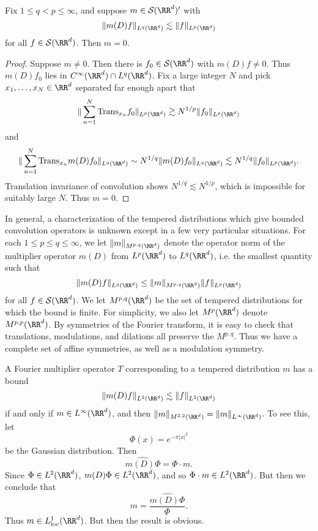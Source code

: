 \begin{theorem}
  Fix $1 \leq q < p \leq \infty$, and suppose $m \in \mathcal{S}(\RR^d)'$ with
  \[ \| m(D) f \|_{L^q(\RR^d)} \lesssim \| f \|_{L^p(\RR^d)} \]
  for all $f \in \mathcal{S}(\RR^d)$. Then $m = 0$.
\end{theorem}
\begin{proof}
  Suppose $m \neq 0$. Then there is $f_0 \in \mathcal{S}(\RR^d)$ with $m(D) f \neq 0$. Thus $m(D) f_0$ lies in $C^\infty(\RR^d) \cap L^q(\RR^d)$. Fix a large integer $N$ and pick $x_1,\dots,x_N \in \RR^d$ separated far enough apart that
  \[ \| \sum_{n = 1}^N \text{Trans}_{x_n} f_0 \|_{L^p(\RR^d)} \gtrsim N^{1/p} \| f_0 \|_{L^p(\RR^d)} \]
  and
  \[ \| \sum_{n = 1}^N \text{Trans}_{x_n} m(D) f_0 \|_{L^q(\RR^d)} \sim N^{1/q} \| m(D) f_0 \|_{L^q(\RR^d)} \lesssim N^{1/q} \| f_0 \|_{L^p(\RR^d)}. \]
  Translation invariance of convolution shows $N^{1/q} \lesssim N^{1/p}$, which is impossible for suitably large $N$. Thus $m = 0$.
\end{proof}

In general, a characterization of the tempered distributions which give bounded convolution operators is unknown except in a few very particular situations. For each $1 \leq p \leq q \leq \infty$, we let $\| m \|_{M^{p,q}(\RR^d)}$ denote the operator norm of the multiplier operator $m(D)$ from $L^p(\RR^d)$ to $L^q(\RR^d)$, i.e. the smallest quantity such that
%
\[ \| m(D) f \|_{L^q(\RR^d)} \leq \| m \|_{M^{p,q}(\RR^d)} \| f \|_{L^p(\RR^d)} \]
%
for all $f \in \mathcal{S}(\RR^d)$. We let $M^{p,q}(\RR^d)$ be the set of tempered distributions for which the bound is finite. For simplicity, we also let $M^p(\RR^d)$ denote $M^{p,p}(\RR^d)$. By symmetries of the Fourier transform, it is easy to check that translations, modulations, and dilations all preserve the $M^{p,q}$. Thus we have a complete set of affine symmetries, as well as a modulation symmetry.

\begin{example}
  A Fourier multiplier operator $T$ corresponding to a tempered distribution $m$ has a bound
  \[ \| m(D)f \|_{L^2(\RR^d)} \lesssim \| f \|_{L^2(\RR^d)} \]
  if and only if $m \in L^\infty(\RR^d)$, and then $\| m \|_{M^{2,2}(\RR^d)} = \| m \|_{L^\infty(\RR^d)}$. To see this, let
  \[ \Phi(x) = e^{- \pi |x|^2} \]
  be the Gaussian distribution. Then
  \[ \widehat{m(D) \Phi} = \Phi \cdot m. \]
  Since $\Phi \in L^2(\RR^d)$, $m(D) \Phi \in L^2(\RR^d)$, and so $\Phi \cdot m \in L^2(\RR^d)$. But then we conclude that
  \[ m = \frac{\widehat{m(D) \Phi}}{\Phi}. \]
  Thus $m \in L^1_{\text{loc}}(\RR^d)$. But then the result is obvious.
\end{example}

